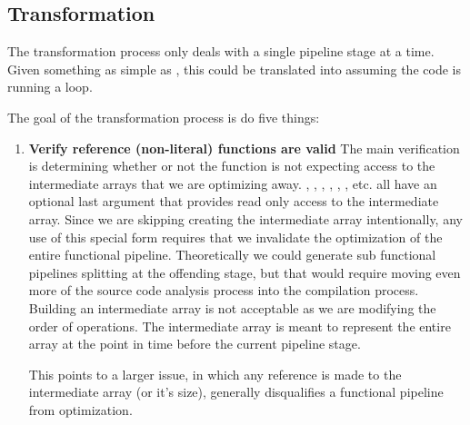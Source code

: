 \subsection{Transformation}\label{Transformation}

The transformation process only deals with a single pipeline stage at a time.  Given something as simple as , this could be translated into  assuming the code is running a  loop.

The goal of the transformation process is do five things:
\begin{enumerate}
  \item \textbf{Verify reference (non-literal) functions are valid}
    The main verification is determining whether or not the function is not expecting access to the intermediate arrays that we are optimizing away.  , , , , , , etc.  all have an optional last argument that provides read only access to the intermediate array.  Since we are skipping creating the intermediate array intentionally, any use of this special form requires that we invalidate the optimization of the entire functional pipeline. Theoretically we could generate sub functional pipelines splitting at the offending stage, but that would require moving even more of the source code analysis process into the compilation process.  Building an intermediate array is not acceptable as we are modifying the order of operations.  The intermediate array is meant to represent the entire array at the point in time before the current pipeline stage.  

    This points to a larger issue, in which any reference is made to the intermediate array (or it's size), generally disqualifies a functional pipeline from optimization.
  

\end{enumerate}
